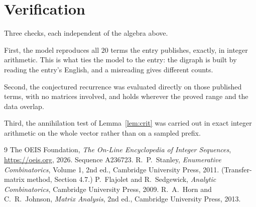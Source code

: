 \documentclass[11pt,a4paper]{article}
\theoremstyle{plain}
\theoremstyle{definition}
\begin{document}
\section{Verification}

Three checks, each independent of the algebra above.

First, the model reproduces all $20$ terms the entry publishes, exactly, in integer
arithmetic. This is what ties the model to the entry: the digraph is built by reading the
entry's English, and a misreading gives different counts.

Second, the conjectured recurrence was evaluated directly on those published terms, with no
matrices involved, and holds wherever the proved range and the data overlap.

Third, the annihilation test of Lemma~\ref{lem:crit} was carried out in exact integer
arithmetic on the whole vector rather than on a sampled prefix.

\begin{thebibliography}{9}
 The OEIS Foundation, \emph{The On-Line Encyclopedia of Integer
Sequences}, \url{https://oeis.org}, 2026. Sequence A236723.
 R.~P.~Stanley, \emph{Enumerative Combinatorics}, Volume 1, 2nd ed.,
Cambridge University Press, 2011. (Transfer-matrix method, Section 4.7.)
 P.~Flajolet and R.~Sedgewick, \emph{Analytic Combinatorics}, Cambridge
University Press, 2009.
 R.~A.~Horn and C.~R.~Johnson, \emph{Matrix Analysis}, 2nd ed., Cambridge
University Press, 2013.
\end{thebibliography}
\end{document}
